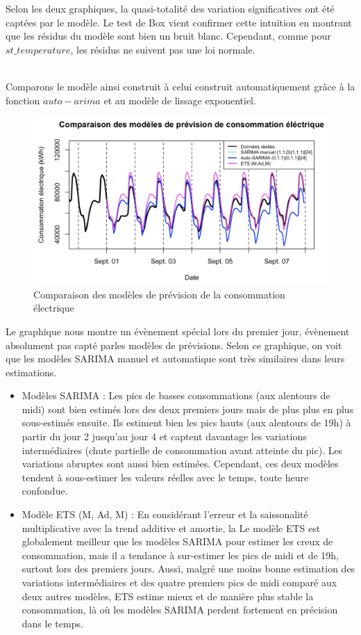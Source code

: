 \documentclass{article}
\theoremstyle{definition}
\theoremstyle{remark}
\begin{document}
\begin{minipage}{.5\textwidth}
    Selon les deux graphiques, la quasi-totalité des variation significatives ont été captées par le modèle. Le test de Box vient confirmer cette intuition en montrant que les résidus du modèle sont bien un bruit blanc. Cependant, comme pour $st\_temperature$, les résidus ne suivent pas une loi normale.\newline \\
\end{minipage}
\newline
\\
Comparons le modèle ainsi construit à celui construit automatiquement grâce à la fonction $auto-arima$ et au modèle de lissage exponentiel.
\FloatBarrier
\begin{figure}[!h]
    \centering
    \includegraphics[width=0.65\linewidth]{fig+.png}
    \caption{Comparaison des modèles de prévision de la consommation électrique}
    \label{fig:enter-label}
\end{figure}
Le graphique nous montre un évènement spécial lors du premier jour, évènement absolument pas capté parles modèles de prévisions. Selon ce graphique, on voit que les modèles SARIMA manuel et automatique sont très similaires dans
leurs estimations. 
\begin{itemize}
    \item Modèles SARIMA : Les pics de basses consommations (aux alentours de midi) sont bien estimés lors des deux premiers jours mais de plus plus en plus sous-estimés ensuite. Ils estiment bien les pics hauts (aux alentours de 19h) à partir du jour 2 jusqu'au jour 4 et captent davantage les variations intermédiaires (chute partielle de consommation avant atteinte du pic).\newline
Les variations abruptes sont aussi bien estimées. Cependant, ces deux modèles tendent à sous-estimer les valeurs réelles avec le temps, toute heure confondue.
    \item Modèle ETS (M, Ad, M) : En considérant l'erreur et la saissonalité multiplicative avec la trend additive et amortie, la Le modèle ETS est globalement meilleur que les modèles SARIMA pour estimer les creux de consommation, mais il a tendance à sur-estimer les pics de midi et de 19h, surtout lors des premiers jours. Aussi, malgré une moins bonne estimation des variations intermédiaires et des quatre premiers pics de midi comparé aux deux autres modèles, ETS estime mieux et de manière plus stable la consommation, là où les
modèles SARIMA perdent fortement en précision dans le temps.
\end{itemize}
\end{document}

